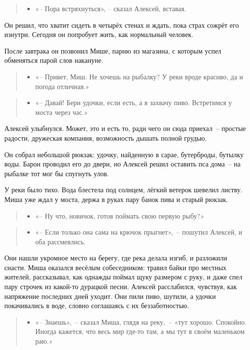 \documentclass[12pt,a4paper]{book}
\newenvironment{dialogue}{\begin{quote}\itshape\begin{itemize}\item[]}{\end{itemize}\end{quote}}
\begin{document}
\begin{dialogue}
    «-- Пора встряхнуться», -- сказал Алексей, вставая.
\end{dialogue}

Он решил, что хватит сидеть в четырёх стенах и ждать, пока страх сожрёт его изнутри. Сегодня он попробует жить, как нормальный человек.

После завтрака он позвонил Мише, парню из магазина, с которым успел обменяться парой слов накануне.

\begin{dialogue}
«-- Привет, Миш. Не хочешь на рыбалку? У реки вроде красиво, да и погода отличная.»
\end{dialogue}

\begin{dialogue}
«-- Давай! Бери удочки, если есть, а я захвачу пиво. Встретимся у моста через час.»
\end{dialogue}

Алексей улыбнулся. Может, это и есть то, ради чего он сюда приехал~-- простые радости, дружеская компания, возможность дышать полной грудью.

Он собрал небольшой рюкзак: удочку, найденную в сарае, бутерброды, бутылку воды. Барон проводил его до двери, но Алексей решил оставить пса дома~-- на рыбалке тот мог бы спугнуть улов.

У реки было тихо. Вода блестела под солнцем, лёгкий ветерок шевелил листву. Миша уже ждал у моста, держа в руках пару банок пива и старый рюкзак.

\begin{dialogue}
«-- Ну что, новичок, готов поймать свою первую рыбу?»
\end{dialogue}

\begin{dialogue}
«-- Если только она сама на крючок прыгнет»,~-- пошутил Алексей, и оба рассмеялись.
\end{dialogue}

Они нашли укромное место на берегу, где река делала изгиб, и разложили снасти. Миша оказался весёлым собеседником: травил байки про местных жителей, рассказывал, как однажды поймал щуку размером с руку, и даже спел пару строчек из какой-то дурацкой песни. Алексей расслабился, чувствуя, как напряжение последних дней уходит. Они пили пиво, шутили, а удочки покачивались в воде, словно соглашаясь с их беззаботностью.

\begin{dialogue}
«-- Знаешь»,~-- сказал Миша, глядя на реку,~-- «тут хорошо. Спокойно. Иногда кажется, что весь мир где-то там, а мы тут в своём маленьком раю.»
\end{dialogue}
\end{document}
